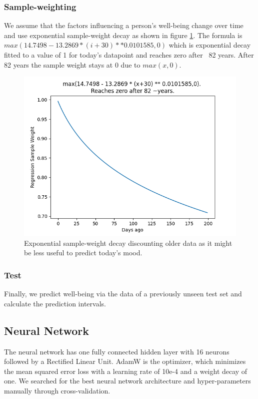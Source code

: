\documentclass[conference]{IEEEtran}
\begin{document}
\subsubsection{Sample-weighting}
We assume that the factors influencing a person's well-being change over time and use exponential sample-weight decay as shown in figure \ref{fig:sample-weight}.
The formula is $max(14.7498 - 13.2869 * (i + 30) ** 0.0101585, 0)$ which is exponential decay fitted to a value of 1 for today's datapoint and reaches zero after ~82 years. After 82 years the sample weight stays at 0 due to $max(x,0)$.
\begin{figure}[htbp]
\begin{center}
\includegraphics[width=1\linewidth]{RegressionSampleWeight.png}
\caption[Sample weight]{Exponential sample-weight decay discounting older data as it might be less useful to predict today's mood.}
\label{fig:sample-weight}
\end{center}
\end{figure}


\subsubsection{Test}
Finally, we predict well-being via the data of a previously unseen test set and calculate the prediction intervals.

\subsection{Neural Network}
The neural network has one fully connected hidden layer with 16 neurons followed by a Rectified Linear Unit. AdamW is the optimizer, which minimizes the mean squared error loss with a learning rate of 10e-4 and a weight decay of one. 
We searched for the best neural network architecture and hyper-parameters manually through cross-validation.
\end{document}
